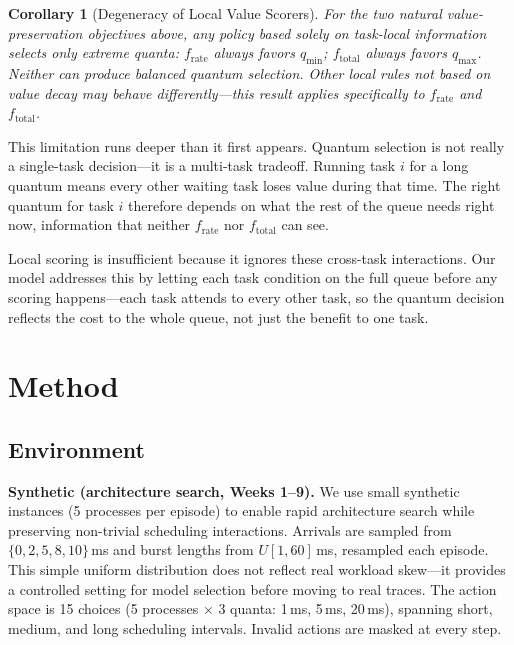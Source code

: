 \documentclass[10pt,twocolumn]{article}
\newtheorem{corollary}[theorem]{Corollary}
\theoremstyle{remark}
\begin{document}
\begin{corollary}[Degeneracy of Local Value Scorers]
\label{cor:global}
For the two natural value-preservation objectives above, any policy
based solely on task-local information selects only extreme quanta:
$f_{\mathrm{rate}}$ always favors $q_{\min}$; $f_{\mathrm{total}}$
always favors $q_{\max}$. Neither can produce balanced quantum
selection. Other local rules not based on value decay may behave
differently---this result applies specifically to
$f_{\mathrm{rate}}$ and $f_{\mathrm{total}}$.
\end{corollary}

This limitation runs deeper than it first appears. Quantum selection
is not really a single-task decision---it is a multi-task tradeoff.
Running task $i$ for a long quantum means every other waiting task
loses value during that time. The right quantum for task $i$
therefore depends on what the rest of the queue needs right now,
information that neither $f_{\mathrm{rate}}$ nor $f_{\mathrm{total}}$
can see.

Local scoring is insufficient because it ignores these cross-task
interactions. Our model addresses this by letting each task condition
on the full queue before any scoring happens---each task attends to
every other task, so the quantum decision reflects the cost to the
whole queue, not just the benefit to one task.

\section{Method}
\label{sec:method}

\subsection{Environment}

\textbf{Synthetic (architecture search, Weeks 1--9).}
We use small synthetic instances (5 processes per episode) to enable
rapid architecture search while preserving non-trivial scheduling
interactions. Arrivals are sampled from $\{0,2,5,8,10\}$\,ms and
burst lengths from $U[1,60]$\,ms, resampled each episode. This
simple uniform distribution does not reflect real workload skew---it
provides a controlled setting for model selection before moving to
real traces. The action space is 15 choices (5 processes $\times$
3 quanta: 1\,ms, 5\,ms, 20\,ms), spanning short, medium, and long
scheduling intervals. Invalid actions are masked at every step.
\end{document}
